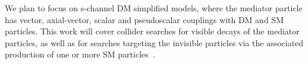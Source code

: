 \documentclass[a4paper, 11pt,notoc]{article}
\begin{document}
We plan to focus on s-channel DM simplified models, where the mediator particle has vector, axial-vector, scalar and pseudoscalar couplings with DM and SM particles. This work will cover collider searches for visible decays of the mediator particles, as well as for searches targeting the invisible particles via the associated production of one or more SM particles~\cite{ATL-PHYS-PUB-2020-021,CMSSummary}.



\end{document}
